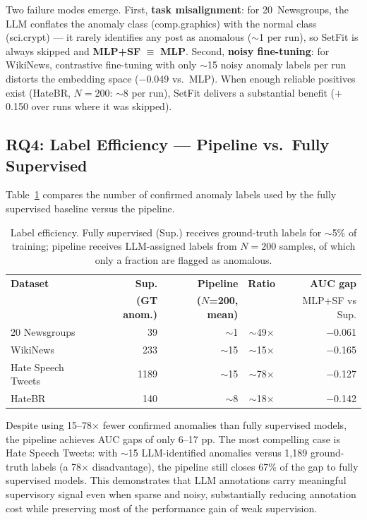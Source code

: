 \documentclass[12pt]{article}
\begin{document}
Two failure modes emerge. First, \textbf{task misalignment}: for 20~Newsgroups, 
the LLM conflates the anomaly class (comp.graphics) with the normal class 
(sci.crypt) — it rarely identifies any post as anomalous ($\sim$1 per run), 
so SetFit is always skipped and \textbf{MLP+SF} $\equiv$ \textbf{MLP}. 
Second, \textbf{noisy fine-tuning}: for WikiNews, contrastive fine-tuning 
with only $\sim$15 noisy anomaly labels per run distorts the embedding space 
($-$0.049 vs.\ MLP). When enough reliable positives exist (HateBR, $N=200$: 
$\sim$8 per run), SetFit delivers a substantial benefit ($+$0.150 over runs 
where it was skipped).

\subsection{RQ4: Label Efficiency --- Pipeline vs.\ Fully Supervised}

Table~\ref{tab:label-efficiency} compares the number of confirmed anomaly labels
used by the fully supervised baseline versus the pipeline.

\renewcommand{\arraystretch}{0.9}
\begin{table}[ht]
\small
\centering
\caption{Label efficiency. Fully supervised (Sup.) receives ground-truth labels for $\sim$5\%
         of training; pipeline receives LLM-assigned labels from $N=200$ samples,
         of which only a fraction are flagged as anomalous.}
\label{tab:label-efficiency}
\begin{tabular}{lrrcr}
\toprule
\textbf{Dataset} & \textbf{Sup.} & \textbf{Pipeline} & \textbf{Ratio} & \textbf{AUC gap} \\
 & \textbf{(GT anom.)} & \textbf{($N$=200, mean)} & & MLP+SF vs Sup. \\
\midrule
20 Newsgroups      & 39   & $\sim$1  & $\sim$49$\times$ & $-$0.061 \\
WikiNews           & 233  & $\sim$15 & $\sim$15$\times$ & $-$0.165 \\
Hate Speech Tweets & 1189 & $\sim$15 & $\sim$78$\times$ & $-$0.127 \\
HateBR             & 140  & $\sim$8  & $\sim$18$\times$ & $-$0.142 \\
\bottomrule
\end{tabular}
\end{table}

Despite using 15--78$\times$ fewer confirmed anomalies than fully supervised models, the
pipeline achieves AUC gaps of only 6--17 pp. The most compelling case is
Hate Speech Tweets: with $\sim$15 LLM-identified anomalies versus 1,189 ground-truth
labels (a 78$\times$ disadvantage), the pipeline still closes 67\% of the
gap to fully supervised models. This demonstrates that LLM annotations carry 
meaningful supervisory signal even when sparse and noisy, substantially 
reducing annotation cost while preserving most of the performance gain 
of weak supervision.
\end{document}
